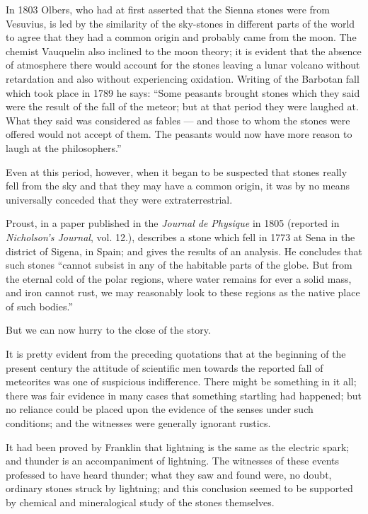 \documentclass[a4paper, 12pt, oneside]{article}
\begin{document}
In 1803 Olbers, who had at first asserted that the Sienna stones were from Vesuvius, is led by the similarity of the sky-stones in different parts of the world to agree that they had a common origin and probably came from the moon. The chemist Vauquelin also inclined to the moon theory; it is evident that the absence of atmosphere there would account for the stones leaving a lunar volcano without retardation and also without experiencing oxidation. Writing of the Barbotan fall which took place in 1789 he says: ``Some peasants brought stones which they said were the result of the fall of the meteor; but at that period they were laughed at. What they said was considered as fables --- and those to whom the stones were offered would not accept of them. The peasants would now have more reason to laugh at the philosophers.'' 

Even at this period, however, when it began to be suspected that stones really fell from the sky and that they may have a common origin, it was by no means universally conceded that they were extraterrestrial.

Proust, in a paper published in the \emph{Journal de Physique} in 1805 (reported in \emph{Nicholson's Journal}, vol. 12.), describes a stone which fell in 1773 at Sena in the district of Sigena, in Spain; and gives the results of an analysis. He concludes that such stones ``cannot subsist in any of the habitable parts of the globe. But from the eternal cold of the polar regions, where water remains for ever a solid mass, and iron cannot rust, we may reasonably look to these regions as the native place of such bodies.''

But we can now hurry to the close of the story.

It is pretty evident from the preceding quotations that at the beginning of the present century the attitude of scientific men towards the reported fall of meteorites was one of suspicious indifference. There might be something in it all; there was fair evidence in many cases that something startling had happened; but no reliance could be placed upon the evidence of the senses under such conditions; and the witnesses were generally ignorant rustics.

It had been proved by Franklin that lightning is the same as the electric spark; and thunder is an accompaniment of lightning. The witnesses of these events professed to have heard thunder; what they saw and found were, no doubt, ordinary stones struck by lightning; and this conclusion seemed to be supported by chemical and mineralogical study of the stones themselves.
\end{document}
